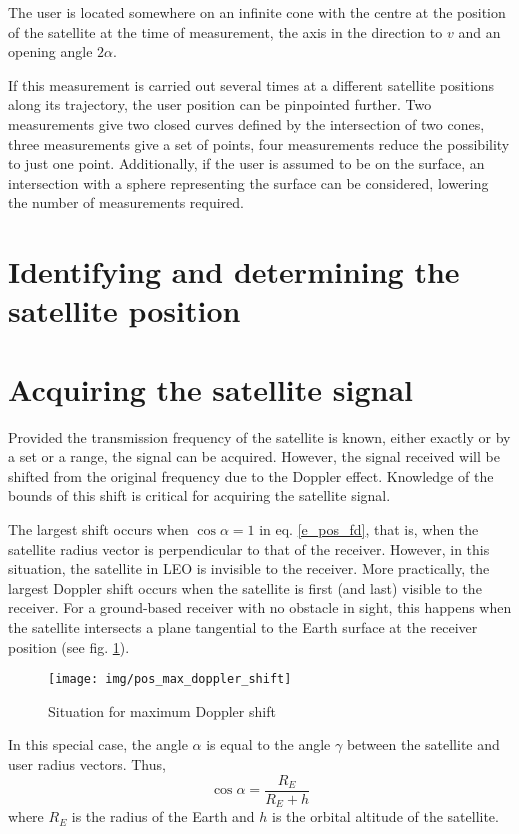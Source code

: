 The user is located somewhere on an infinite cone with the centre at the position of the satellite at the time of measurement, the axis in the direction to $v$ and an opening angle $2\alpha$.

If this measurement is carried out several times at a different satellite positions along its trajectory, the user position can be pinpointed further. Two measurements give two closed curves defined by the intersection of two cones, three measurements give a set of points, four measurements reduce the possibility to just one point. Additionally, if the user is assumed to be on the surface, an intersection with a sphere representing the surface can be considered, lowering the number of measurements required.


\section{Identifying and determining the satellite position}

\section{Acquiring the satellite signal}
Provided the transmission frequency of the satellite is known, either exactly or by a set or a range, the signal can be acquired. However, the signal received will be shifted from the original frequency due to the Doppler effect. Knowledge of the bounds of this shift is critical for acquiring the satellite signal.

The largest shift occurs when $\cos{\alpha} = 1$ in eq. \ref{e_pos_fd}, that is, when the satellite radius vector is perpendicular to that of the receiver. However, in this situation, the satellite in LEO is invisible to the receiver. More practically, the largest Doppler shift occurs when the satellite is first (and last) visible to the receiver. For a ground-based receiver with no obstacle in sight, this happens when the satellite intersects a plane tangential to the Earth surface at the receiver position (see fig. \ref{f_pos_max_doppler_shift}).

\begin{figure}
    \centering
    \texttt{[image: img/pos\_max\_doppler\_shift]}
    \caption{Situation for maximum Doppler shift}
    \label{f_pos_max_doppler_shift}
\end{figure}

In this special case, the angle $\alpha$ is equal to the angle $\gamma$ between the satellite and user radius vectors. Thus,
\begin{equation*}
    \cos{\alpha} = \frac{R_E}{R_E + h}
\end{equation*}
where $R_E$ is the radius of the Earth and $h$ is the orbital altitude of the satellite.

